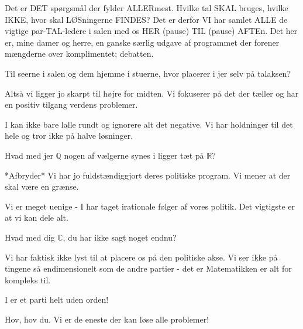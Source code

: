 \documentclass[a4paper,11pt]{article}
\begin{document}
\begin{sketch}

 Det er DET spørgsmål der fylder ALLERmest. Hvilke tal SKAL bruges, hvilke IKKE, hvor skal LØSningerne FINDES? Det er derfor VI har samlet ALLE de vigtige par-TAL-ledere i salen med os HER (pause) TIL (pause) AFTEn. Det her er, mine damer og herre, en ganske særlig udgave af programmet der forener mængderne over komplimentet; debatten.


 Til seerne i salen og dem hjemme i stuerne, hvor placerer 
i jer selv på talaksen?

 Altså vi ligger jo skarpt til højre for midten. Vi fokuserer på det der tæller og har en positiv tilgang verdens problemer.

 I kan ikke bare lalle rundt og ignorere alt det negative. Vi har holdninger til det hele og tror ikke på halve løsninger.

 Hvad med jer \ensuremath{\mathbb{Q}} nogen af vælgerne synes i ligger tæt på \ensuremath{\mathbb{R}}?

 *Afbryder* Vi har jo fuldstændiggjort deres politiske program. Vi mener at der skal være en grænse.

 Vi er meget uenige - I har taget irationale følger af vores politik. Det vigtigste er at vi kan dele alt.

 Hvad med dig \ensuremath{\mathbb{C}}, du har ikke sagt noget endnu?

 Vi har faktisk ikke lyst til at placere os på den politiske akse. Vi ser ikke på tingene så endimensionelt som de andre partier - det er Matematikken er alt for kompleks til. 


 I er et parti helt uden orden!

 Hov, hov du. Vi er de eneste der kan løse alle problemer!


\end{sketch}
\end{document}
